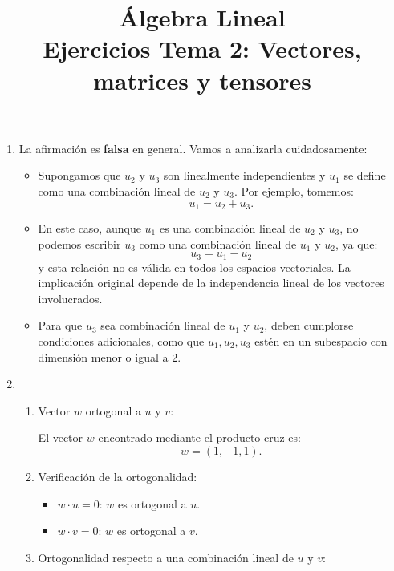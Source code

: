 
\title{Álgebra Lineal\\ Ejercicios Tema 2: Vectores, matrices y tensores}


\maketitle
\begin{enumerate}[label=\color{red}\textbf{\arabic*)}]
    \item {}

La afirmación es \textbf{falsa}  en general. Vamos a analizarla cuidadosamente:
\begin{itemize}[label=\textbullet]
    \item Supongamos que $u_2$ y $u_3$ son linealmente independientes y $u_1$ se define como una combinación lineal de $u_2$ y $u_3$. Por ejemplo, tomemos: \[
    u_1=u_2+u_3.
    \] 
\item En este caso, aunque $u_1$ es una combinación lineal de $u_2$ y $u_3$, no podemos escribir $u_3$ como una combinación lineal de $u_1$ y $u_2$, ya que: \[
u_3=u_1-u_2
\] y esta relación no es válida en todos los espacios vectoriales. La implicación original depende de la independencia lineal de los vectores involucrados.
\item Para que $u_3$ sea combinación lineal de $u_1$ y $u_2$, deben cumplorse condiciones adicionales, como que $u_1,u_2,u_3$ estén en un subespacio con dimensión menor o igual a 2.
\end{itemize}
\item {}

    \begin{enumerate}[label=\arabic*)]
        \item Vector $w$ ortogonal a $u$ y $v$:

            El vector  $w$ encontrado mediante el producto cruz es: \[
            w=(1,-1,1).
            \] 
        \item Verificación de la ortogonalidad:
            \begin{itemize}[label=\textbullet]
                \item $w\cdot u=0:\,w$ es ortogonal a $u$.
                \item  $w\cdot v=0:\,w$ es ortogonal a $v$.
            \end{itemize}
        \item Ortogonalidad respecto a una combinación lineal de $u$ y  $v$:


\end{enumerate}
\end{enumerate}
